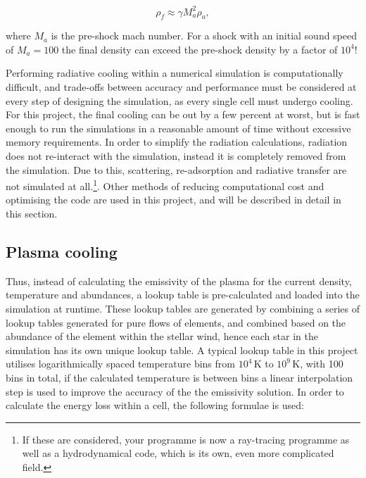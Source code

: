 \begin{equation}
  \rho_f \approx \gamma M_a^2 \rho_a,
\end{equation}

\noindent
where $M_a$ is the pre-shock mach number.
For a shock with an initial sound speed of $M_a = 100$ the final density can exceed the pre-shock density by a factor of $10^4$!


Performing radiative cooling within a numerical simulation is computationally difficult, and trade-offs between accuracy and performance must be considered at every step of designing the simulation, as every single cell must undergo cooling.
For this project, the final cooling can be out by a few percent at worst, but is fast enough to run the simulations in a reasonable amount of time without excessive memory requirements.
In order to simplify the radiation calculations, radiation does not re-interact with the simulation, instead it is completely removed from the simulation.
Due to this, scattering, re-adsorption and radiative transfer are not simulated at all.\footnote{If these are considered, your programme is now a ray-tracing programme as well as a hydrodynamical code, which is its own, even more complicated field.}.
Other methods of reducing computational cost and optimising the code are used in this project, and will be described in detail in this section.

\subsection{Plasma cooling}



Thus, instead of calculating the emissivity of the plasma for the current density, temperature and abundances, a lookup table is pre-calculated and loaded into the simulation at runtime.
These lookup tables are generated by combining a series of lookup tables generated for pure flows of elements, and combined based on the abundance of the element within the stellar wind, hence each star in the simulation has its own unique lookup table.
A typical lookup table in this project utilises logarithmically spaced temperature bins from $10^4\,\si{\kelvin}$ to $10^9\,\si{\kelvin}$, with 100 bins in total, if the calculated temperature is between bins a linear interpolation step is used to improve the accuracy of the the emissivity solution.
In order to calculate the energy loss within a cell, the following formulae is used:

